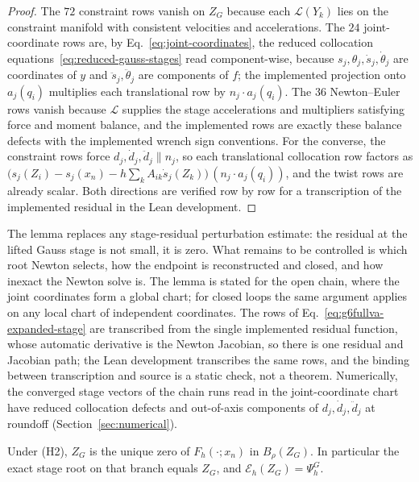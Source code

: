 \begin{proof}
The $72$ constraint rows vanish on $Z_G$ because each $\mathcal L(Y_k)$ lies on the constraint
manifold with consistent velocities and accelerations. The $24$ joint-coordinate rows are, by
Eq.~\eqref{eq:joint-coordinates}, the reduced collocation equations~\eqref{eq:reduced-gauss-stages}
read component-wise, because $s_j,\theta_j,\dot s_j,\dot\theta_j$ are coordinates of $y$ and
$\ddot s_j,\ddot\theta_j$ are components of $f$; the implemented projection onto $a_j(q_i)$
multiplies each translational row by $n_j\cdot a_j(q_i)$. The $36$ Newton--Euler rows vanish because
$\mathcal L$ supplies the stage accelerations and multipliers satisfying force and moment balance,
and the implemented rows are exactly these balance defects with the implemented wrench sign
conventions. For the converse, the constraint rows force $d_j,\dot d_j,\ddot d_j\parallel n_j$, so
each translational collocation row factors as
$\bigl(s_j(Z_i)-s_j(x_n)-h\sum_kA_{ik}\dot s_j(Z_k)\bigr)\,(n_j\cdot a_j(q_i))$, and the twist rows
are already scalar. Both directions are verified row by row for a transcription of the implemented
residual in the Lean development.
\end{proof}

The lemma replaces any stage-residual perturbation estimate: the residual at the lifted Gauss
stage is not small, it is zero. What remains to be controlled is which root Newton selects, how the
endpoint is reconstructed and closed, and how inexact the Newton solve is. The lemma is stated for
the open chain, where the joint coordinates form a global chart; for closed loops the same argument
applies on any local chart of independent coordinates. The rows of
Eq.~\eqref{eq:g6fullva-expanded-stage} are transcribed from the single implemented residual
function, whose automatic derivative is the Newton Jacobian, so there is one residual and Jacobian
path; the Lean development transcribes the same rows, and the binding between transcription and
source is a static check, not a theorem. Numerically, the converged stage vectors of the chain runs
read in the joint-coordinate chart have reduced collocation defects and out-of-axis components of
$d_j,\dot d_j,\ddot d_j$ at roundoff (Section~\ref{sec:numerical}).

\begin{lemma}
\label{lem:stage-residual-defect}
Under (H2), $Z_G$ is the unique zero of $F_h(\cdot;x_n)$ in $B_\rho(Z_G)$. In particular the exact
stage root on that branch equals $Z_G$, and $\mathcal E_h(Z_G)=\Psi_h^G$.
\end{lemma}

